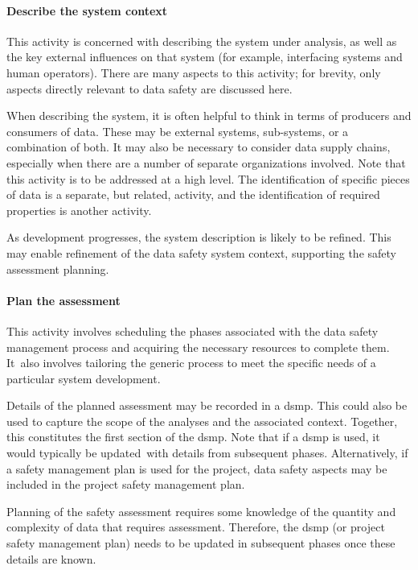 \paragraph{Describe the system context}
This activity is concerned with describing the system under analysis, as well as the key external influences on that system (\cbstart for example, interfacing systems and human operators). There are many aspects to this activity; for brevity, only aspects directly relevant to data safety are discussed here\cbend.

\cbstart When describing the system, it is often helpful to think in terms of producers and consumers of data. These may be external systems, sub-systems, or a combination of both. It may also be necessary to consider data supply chains, especially when there are a number of separate organizations involved. Note that this activity is to be addressed at a high level. The identification of specific pieces of data is a separate, but related, activity, and the identification of required properties is another activity\cbend.

\cbstart As development progresses, the system description is likely to be refined. This may enable refinement of the data safety system context, supporting the \gls{safety assessment} planning.\cbend\

\paragraph{Plan the assessment}
This activity involves scheduling the phases associated with the data safety management process and acquiring the necessary resources to complete them. \cbstart It\cbend\ also involves tailoring the generic process to meet the specific needs of a particular system development. 

Details of the planned assessment may be recorded in a \gls{dsmp}. This could also be used to capture the scope of the analyses and the associated context. Together, \cbstart this constitutes the first section of the \gls{dsmp}\cbend. Note that if a \gls{dsmp} is \cbstart used, it would typically be updated\cbend\ with details from subsequent phases. Alternatively, if a safety management plan \cbstart is used for the project, data safety aspects may be included in the project safety management plan\cbend. 

Planning of the \gls{safety assessment} requires some knowledge of the quantity and complexity of data that requires assessment. Therefore, the \gls{dsmp} (or \cbstart project safety management plan\cbend) needs to be updated in subsequent phases once these details are known.\cbend\

